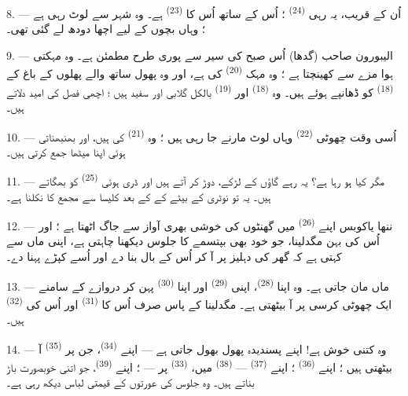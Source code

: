 8. --- اُن کے قریب، یہ رہی  \textsuperscript{(24)} ؛
اُس کے ساتھ اُس کا  \textsuperscript{(23)} ہے۔ وہ شہر سے
لوٹ رہی ہے ؛ وہاں بچوں کے لیے اچھا دودھ لے گئی تھی۔

\VUsaut{4.0mm}
\VUsaut{3.4mm}

9. --- الیبورون صاحب (گدھا) اُس صبح کی سیر سے پوری طرح مطمئن ہے۔ وہ
مہکتی ہوا مزے سے کھینچتا ہے ؛ وہ مہک 
\textsuperscript{(20)} کی ہے، اور وہ پھول ساتھ والے پھلوں کے باغ کے
 \textsuperscript{(18)} کو ڈھانپے ہوئے ہیں۔ وہ
 \textsuperscript{(18)} اور  \textsuperscript{(19)} بالکل گلابی اور سفید ہیں ؛ اچھی فصل کی
امید دلاتے ہیں۔

10. --- اُسی وقت چھوٹی  \textsuperscript{(22)}
وہاں لوٹ مارنے جا رہی ہیں ؛ وہ  \textsuperscript{(21)}
کی ہیں، اور بھنبھناتی ہوئی اپنا میٹھا  جمع کرتی ہیں۔

11. --- مگر کیا ہو رہا ہے؟ یہ رہے گاؤں کے لڑکے، دوڑ کر آتے ہیں اور
ڈری ہوئی  \textsuperscript{(25)} کو بھگاتے ہیں۔ یہ تو
نوٹری کے بیٹے کے  کے بعد کلیسا سے مجمع کا نکلنا ہے۔

12. --- ننھا یاکوبس اپنے  \textsuperscript{(26)} میں
گھنٹوں کی خوشی بھری آواز سے جاگ اٹھتا ہے ؛ اور اُس کی بہن مگدلینا،
جو خود بھی بپتسمے کا جلوس دیکھنا چاہتی ہے، اپنی ماں سے کہتی ہے کہ
گھر کی دہلیز پر آ کر اُس کے بال بنا دے اور اُسے کپڑے پہنا دے۔

13. --- ماں مان جاتی ہے۔ وہ اپنا  \textsuperscript{(28)}،
اپنی  \textsuperscript{(29)} اور اپنا 
\textsuperscript{(30)} پہن کر دروازے کے سامنے ایک چھوٹی کرسی پر آ
بیٹھتی ہے۔ مگدلینا کے پاس صرف اُس کا 
\textsuperscript{(31)} اور اُس کی  \textsuperscript{(32)}
ہیں۔

14. --- وہ کتنی خوش ہے! اپنے پسندیدہ پھول بھول جاتی ہے — اپنے
 \textsuperscript{(34)}، جن پر 
\textsuperscript{(35)} آ بیٹھتی ہیں ؛ اپنے 
\textsuperscript{(36)} ؛ اپنے 
\textsuperscript{(37)} —  \textsuperscript{(38)} میں،
 \textsuperscript{(33)} پر — ؛ اپنے 
\textsuperscript{(39)}، جو اتنی خوبصورت باڑ بناتے ہیں۔ وہ جلوس کی
عورتوں کے قیمتی لباس دیکھ رہی ہے۔

